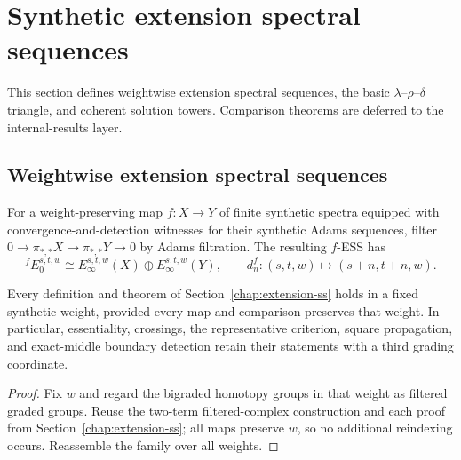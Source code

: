 \section{Synthetic extension spectral sequences}
\label{chap:synthetic-extension-ss}

This section defines weightwise extension spectral sequences, the basic $\lambda$--$\rho$--$\delta$ triangle, and coherent solution towers.  Comparison theorems are deferred to the internal-results layer.

\subsection{Weightwise extension spectral sequences}

\begin{definition}
  \label{def:synthetic-extension-ss}
  \notready
  For a weight-preserving map $f:X\to Y$ of finite synthetic spectra equipped
  with convergence-and-detection witnesses for their synthetic Adams
  sequences, filter
  $0\to\pi_{*,*}X\to\pi_{*,*}Y\to0$ by Adams filtration.  The resulting
  $f$-ESS has
  \[
    {}^fE_0^{s,t,w}\cong E_\infty^{s,t,w}(X)\oplus
    E_\infty^{s,t,w}(Y),
    \qquad d_n^f:(s,t,w)\mapsto(s+n,t+n,w).
  \]
\end{definition}

\begin{proposition}
  \label{prop:synthetic-ess-weightwise-transport}
  \notready
  Every definition and theorem of Section~\ref{chap:extension-ss} holds in a
  fixed synthetic weight, provided every map and comparison preserves that
  weight.  In particular, essentiality, crossings, the representative
  criterion, square propagation, and exact-middle boundary detection retain
  their statements with a third grading coordinate.
\end{proposition}

\begin{proof}
  Fix $w$ and regard the bigraded homotopy groups in that weight as filtered
  graded groups.  Reuse the two-term filtered-complex construction and each
  proof from Section~\ref{chap:extension-ss}; all maps preserve $w$, so no
  additional reindexing occurs.  Reassemble the family over all weights.
\end{proof}


